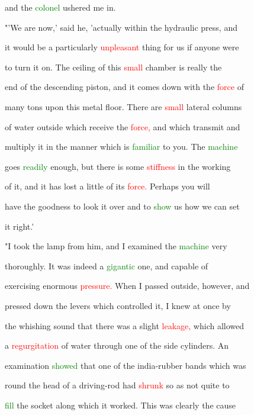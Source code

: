  and the \textcolor{green}{colonel} ushered me in.



 "'We are now,' said he, 'actually within the hydraulic press, and

 it would be a particularly \textcolor{red}{unpleasant} thing for us if anyone were

 to turn it on. The ceiling of this \textcolor{red}{small} chamber is really the

 end of the descending piston, and it comes down with the \textcolor{red}{force} of

 many tons upon this metal floor. There are \textcolor{red}{small} lateral columns

 of water outside which receive the \textcolor{red}{force,} and which transmit and

 multiply it in the manner which is \textcolor{green}{familiar} to you. The \textcolor{green}{machine}

 goes \textcolor{green}{readily} enough, but there is some \textcolor{red}{stiffness} in the working

 of it, and it has \textcolor{BurntOrange}{lost} a little of its \textcolor{red}{force.} Perhaps you will

 have the \textcolor{BurntOrange}{goodness} to look it over and to \textcolor{green}{show} us how we can set

 it right.'



 "I took the lamp from him, and I examined the \textcolor{green}{machine} very

 thoroughly. It was indeed a \textcolor{green}{gigantic} one, and capable of

 exercising enormous \textcolor{red}{pressure.} When I passed outside, however, and

 pressed down the levers which controlled it, I knew at once by

 the whishing sound that there was a slight \textcolor{red}{leakage,} which allowed

 a \textcolor{red}{regurgitation} of water through one of the side cylinders. An

 \textcolor{BurntOrange}{examination} \textcolor{green}{showed} that one of the india-rubber bands which was

 round the head of a driving-rod had \textcolor{red}{shrunk} so as not quite to

 \textcolor{green}{fill} the socket along which it worked. This was clearly the cause

